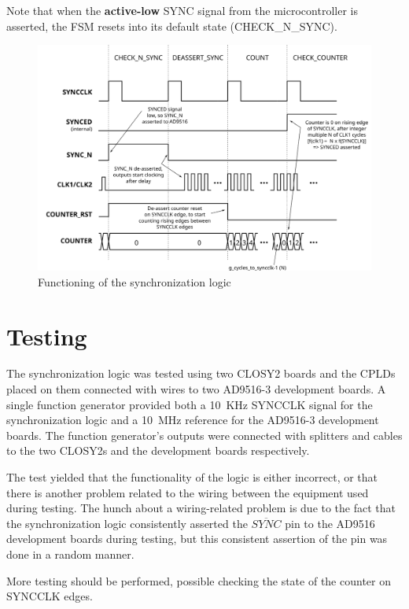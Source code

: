 \documentclass[a4paper,11pt]{article}
\begin{document}
Note that when the \textbf{active-low} SYNC signal from the microcontroller is asserted,
the FSM resets into its default state (CHECK\_N\_SYNC).

\begin{figure}[h]
  \centerline{\includegraphics[width=\textwidth]{fig/fsm}}
  \caption{\label{fig:fsm} Functioning of the synchronization logic}
\end{figure}

\section{Testing}
\label{sec:testing}

The synchronization logic was tested using two CLOSY2 boards and the CPLDs placed on them
connected with wires to two AD9516-3 development boards. A single function generator
provided both a 10~KHz SYNCCLK signal for the synchronization logic and a 10~MHz reference 
for the AD9516-3 development boards. The function generator's outputs were connected
with splitters and cables to the two CLOSY2s and the development boards respectively.

The test yielded that the functionality of the logic is either incorrect, or that there
is another problem related to the wiring between the equipment used during testing. The
hunch about a wiring-related problem is due to the fact that the synchronization logic 
consistently asserted the $\overline{SYNC}$ pin to the AD9516 development boards during
testing, but this consistent assertion of the pin was done in a random manner.

More testing should be performed, possible checking the state of the counter on SYNCCLK
edges.
\end{document}

